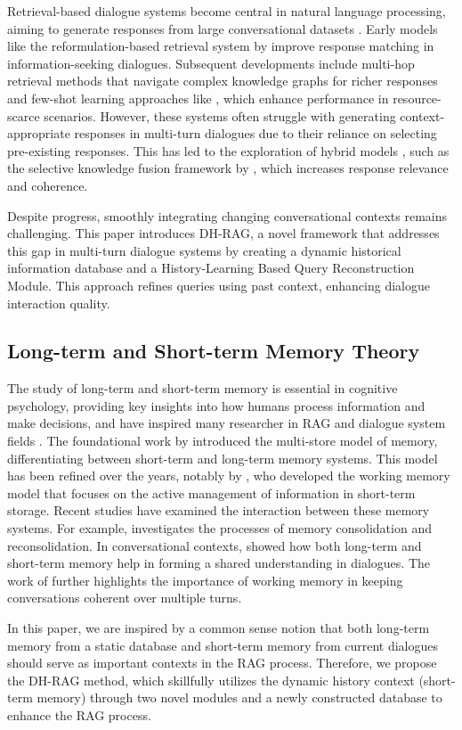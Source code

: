Retrieval-based dialogue systems \cite{ni2023recent,tao2021survey} become central in natural language processing, aiming to generate responses from large conversational datasets \cite{achiam2023gpt}. Early models like the reformulation-based retrieval system by \cite{yan2016learning} improve response matching in information-seeking dialogues. Subsequent developments include multi-hop retrieval methods \cite{xu2021beyond} that navigate complex knowledge graphs for richer responses and few-shot learning approaches like \cite{yu2021few}, which enhance performance in resource-scarce scenarios. However, these systems often struggle with generating context-appropriate responses in multi-turn dialogues due to their reliance on selecting pre-existing responses. This has led to the exploration of hybrid models \cite{sawarkar2024blended,xu2024retrieval}, such as the selective knowledge fusion framework by \cite{su2023selective}, which increases response relevance and coherence.

Despite progress, smoothly integrating changing conversational contexts remains challenging. This paper introduces DH-RAG, a novel framework that addresses this gap in multi-turn dialogue systems by creating a dynamic historical information database and a History-Learning Based Query Reconstruction Module. This approach refines queries using past context, enhancing dialogue interaction quality.

\subsection{Long-term and Short-term Memory Theory} 

The study of long-term and short-term memory is essential in cognitive psychology, providing key insights into how humans process information and make decisions, and have inspired many researcher in RAG \cite{cheng2024lift,hu2023reveal} and dialogue system fields \cite{zhang2019memory, bang2015example}. The foundational work by \cite{atkinson1968human} introduced the multi-store model of memory, differentiating between short-term and long-term memory systems. This model has been refined over the years, notably by \cite{baddeley1974working}, who developed the working memory model that focuses on the active management of information in short-term storage. Recent studies have examined the interaction between these memory systems. For example, \cite{dudai2015consolidation} investigates the processes of memory consolidation and reconsolidation. In conversational contexts, \cite{horton2016conversational} showed how both long-term and short-term memory help in forming a shared understanding in dialogues. The work of \cite{kumar2022role} further highlights the importance of working memory in keeping conversations coherent over multiple turns.

In this paper, we are inspired by a common sense notion that both long-term memory from a static database and short-term memory from current dialogues should serve as important contexts in the RAG process. Therefore, we propose the DH-RAG method, which skillfully utilizes the dynamic history context (short-term memory) through two novel modules and a newly constructed database to enhance the RAG process.
